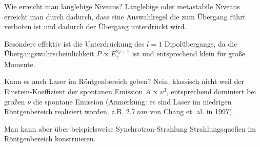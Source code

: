\begin{fquestion}{Wie erreicht man langlebige Niveaus?}
    Langlebige oder metastabile Niveaus erreicht man durch dadurch, dass eine Auswahlregel die zum Übergang führt verboten ist und dadurch der Übergang unterdrückt wird.
    
    Besonders effektiv ist die Unterdrückung des $l=1$ Dipolübergangs, da die Übergangswahrscheinlichkeit $P \propto E_\gamma^{2j + 1}$ ist und entsprechend klein für große Momente.
\end{fquestion}




\begin{fquestion}{Kann es auch Laser im Röntgenbereich geben?}
    Nein, klassisch nicht weil der Einstein-Koeffizient der spontanen Emission $A \propto \nu^3$, entsprechend dominiert bei großen $\nu$ die spontane Emission (Anmerkung: es sind Laser im niedrigen Röntgenbereich realisiert worden, z.B. $\SI{2.7}{nm}$ von Chang et. al. in 1997).
    
    Man kann aber über beispielsweise Synchrotron-Strahlung Strahlungsquellen im Röntgenbereich konstruieren.
\end{fquestion}

